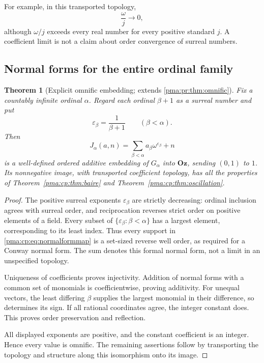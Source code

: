 \documentclass[11pt]{article}
\numberwithin{equation}{section}
\newtheorem{theorem}{Theorem}[section]
\theoremstyle{definition}
\theoremstyle{remark}
\newcommand{\Oz}{\mathbf{Oz}}
\begin{document}
For example, in this transported topology,
\[
\frac{\omega}{j}\longrightarrow0,
\]
although $\omega/j$ exceeds every real number for every positive standard
$j$. A coefficient limit is not a claim about order convergence of
surreal numbers.

\subsection{Normal forms for the entire ordinal family}

\begin{theorem}[Explicit omnific embedding; extends \cref{pma:pr:thm:omnific}]
\label{pma:cp:thm:omnific}
Fix a countably infinite ordinal $\alpha$. Regard each ordinal
$\beta+1$ as a surreal number and put
\[
\varepsilon_\beta=\frac{1}{\beta+1}\qquad(\beta<\alpha).
\]
Then
\begin{equation}
\label{pma:cp:eq:normalformmap}
J_\alpha(a,n)
=\sum_{\beta<\alpha}a_\beta\omega^{\varepsilon_\beta}+n
\end{equation}
is a well-defined ordered additive embedding of $G_\alpha$ into $\Oz$,
sending $(0,1)$ to $1$. Its nonnegative image, with transported coefficient
topology, has all the properties of Theorem~\ref{pma:cp:thm:baire} and
Theorem~\ref{pma:cp:thm:oscillation}.
\end{theorem}

\begin{proof}
The positive surreal exponents $\varepsilon_\beta$ are strictly
decreasing: ordinal inclusion agrees with surreal order, and reciprocation
reverses strict order on positive elements of a field. Every subset of
$\{\varepsilon_\beta:\beta<\alpha\}$ has a largest element,
corresponding to its least index. Thus every support in
\eqref{pma:cp:eq:normalformmap} is a set-sized reverse well order, as required
for a Conway normal form. The sum denotes this formal normal form,
not a limit in an unspecified topology.

Uniqueness of coefficients proves injectivity. Addition of normal forms
with a common set of monomials is coefficientwise, proving additivity.
For unequal vectors, the least differing $\beta$ supplies the largest
monomial in their difference, so determines its sign. If all rational
coordinates agree, the integer constant does. This proves order
preservation and reflection.

All displayed exponents are positive, and the constant coefficient is an
integer. Hence every value is omnific. The remaining assertions follow
by transporting the topology and structure along this isomorphism onto
its image.
\end{proof}
\end{document}
